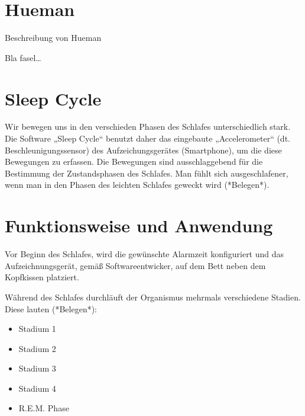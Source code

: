 \section{Hueman}
\label{ch:Apps:sec:Hueman}

Beschreibung von Hueman

Bla fasel\ldots

\section{Sleep Cycle}
\label{ch:Apps:sec:SleepCycle}

Wir bewegen uns in den verschieden Phasen des Schlafes unterschiedlich stark. Die Software „Sleep Cycle“ benutzt daher das eingebaute „Accelerometer“ (dt. Beschleunigungssensor) des Aufzeichungsgerätes (Smartphone), um die diese Bewegungen zu erfassen. Die Bewegungen sind ausschlaggebend für die Bestimmung der Zustandsphasen des Schlafes. Man fühlt sich ausgeschlafener, wenn man in den Phasen des leichten Schlafes geweckt wird (*Belegen*). 

\section{Funktionsweise und Anwendung}

Vor Beginn des Schlafes, wird die gewünschte Alarmzeit konfiguriert und das Aufzeichnungsgerät, gemäß Softwareentwicker, auf dem Bett neben dem Kopfkissen platziert. 

Während des Schlafes durchläuft der Organismus mehrmals verschiedene Stadien. Diese lauten (*Belegen*):

\begin{itemize}
	\item Stadium 1
	\item Stadium 2
	\item Stadium 3
	\item Stadium 4
	\item R.E.M. Phase
\end{itemize}


